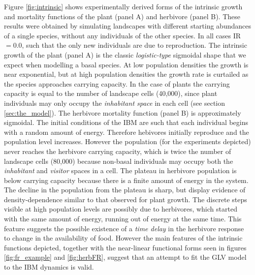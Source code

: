 Figure \ref{fig:intrinsic} shows experimentally derived forms of the intrinsic growth and mortality functions of the plant (panel A) and herbivore (panel B). These results were obtained by simulating landscapes with different starting abundances of a single species, without any individuals of the other species. In all cases IR$=0.0$, such that the only new individuals are due to reproduction. The intrinsic growth of the plant (panel A) is the classic \emph{logistic-type} sigmoidal shape that we expect when modelling a basal species. At low population densities the growth is near exponential, but at high population densities the growth rate is curtailed as the species approaches carrying capacity. In the case of plants the carrying capacity is equal to the number of landscape cells (40,000), since plant individuals may only occupy the \emph{inhabitant space} in each cell (see section \ref{sec:the_model}). The herbivore mortality function (panel B) is approximately sigmoidal. The initial conditions of the IBM are such that each individual begins with a random amount of energy. Therefore hebivores initially reproduce and the population level increases. However the population (for the experiments depicted) never reaches the herbivore carrying capacity, which is twice the number of landscape cells (80,000) because non-basal individuals may occupy both the \emph{inhabitant} and \emph{visitor} spaces in a cell. The plateau in herbivore population is below carrying capacity because there is a finite amount of energy in the system. The decline in the population from the plateau is sharp, but display evidence of density-dependence similar to that observed for plant growth. The discrete steps visible at high population levels are possibly due to herbivores, which started with the same amount of energy, running out of energy at the same time. This feature suggests the possible existence of a \emph{time delay} in the herbivore response to change in the availability of food. However the main features of the intrinsic functions depicted, together with the near-linear functional forms seen in figures \ref{fig:fr_example} and \ref{fig:herbFR}, suggest that an attempt to fit the GLV model to the IBM dynamics is valid. 

%
%
%



